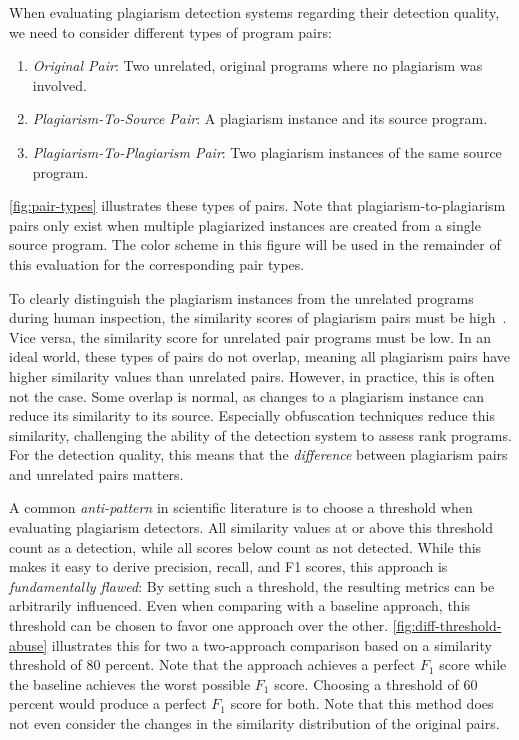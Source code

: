 When evaluating plagiarism detection systems regarding their detection quality, we need to consider different types of program pairs:
\begin{enumerate}
\item \textit{Original Pair}: Two unrelated, original programs where no plagiarism was involved.
\item \textit{Plagiarism-To-Source Pair}: A plagiarism instance and its source program.
\item \textit{Plagiarism-To-Plagiarism Pair}: Two plagiarism instances of the same source program.
\end{enumerate}
\autoref{fig:pair-types} illustrates these types of pairs. Note that plagiarism-to-plagiarism pairs only exist when multiple plagiarized instances are created from a single source program. The color scheme in this figure will be used in the remainder of this evaluation for the corresponding pair types.

To clearly distinguish the plagiarism instances from the unrelated programs during human inspection, the similarity scores of plagiarism pairs must be high~\cite{Saglam2024b}. Vice versa, the similarity score for unrelated pair programs must be low. In an ideal world, these types of pairs do not overlap, meaning all plagiarism pairs have higher similarity values than unrelated pairs. However, in practice, this is often not the case. Some overlap is normal, as changes to a plagiarism instance can reduce its similarity to its source. Especially obfuscation techniques reduce this similarity, challenging the ability of the detection system to assess rank programs.
For the detection quality, this means that the \textit{difference} between plagiarism pairs and unrelated pairs matters.

A common \textit{anti-pattern} in scientific literature is to choose a threshold when evaluating plagiarism detectors. All similarity values at or above this threshold count as a detection, while all scores below count as not detected. While this makes it easy to derive precision, recall, and F1 scores, this approach is \textit{fundamentally flawed}: By setting such a threshold, the resulting metrics can be arbitrarily influenced. Even when comparing with a baseline approach, this threshold can be chosen to favor one approach over the other.
\autoref{fig:diff-threshold-abuse} illustrates this for two a two-approach comparison based on a similarity threshold of 80 percent.
Note that the approach achieves a perfect $F_1$ score while the baseline achieves the worst possible $F_1$ score. Choosing a threshold of 60 percent would produce a perfect $F_1$ score for both. Note that this method does not even consider the changes in the similarity distribution of the original pairs.

